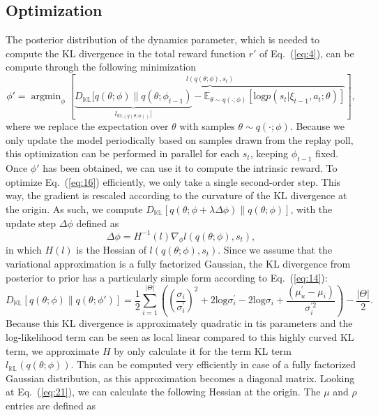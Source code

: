 \documentclass{article}
\begin{document}
	 \subsection{Optimization}
	 The posterior distribution of the dynamics parameter, which is needed to compute the KL divergence in the total reward function $r'$ of Eq.~(\ref{eq:4}), can be compute through the following minimization
	 \begin{equation}
	 \phi' = \mathop{\text{argmin}}_{\phi}\left[\overbrace{\underbrace{D_{\mathds{KL}}[q(\theta;\phi)\|q(\theta;\phi_{t-1})}_{l_{\mathds{KL}(q(\theta;\phi))}]}-\mathds{E}_{\theta\sim q(\cdot;\phi)}[\text{log}p(s_t|\xi_{t-1},a_t;\theta)]}^{l(q(\theta;\phi),s_t)}\right],\label{eq:16}
	 \end{equation}
	 where we replace the expectation over $\theta$ with samples $\theta\sim q(\cdot;\phi)$. Because we only update the model periodically based on samples drawn from the replay poll, this optimization can be performed in parallel for each $s_t$, keeping $\phi_{t-1}$ fixed. Once $\phi'$ has been obtained, we can use it to compute the intrinsic reward.
	 To optimize Eq.~(\ref{eq:16}) efficiently, we only take a single second-order step. This way, the gradient is rescaled according to the curvature of the KL divergence at the origin. As such, we compute $D_{\mathds{KL}}[q(\theta;\phi+\lambda\Delta\phi)\|q(\theta;\phi)]$, with the update step $\Delta\phi$ defined as
	 \begin{equation}
	 \Delta{\phi} = H^{-1}(l)\nabla_\phi l(q(\theta;\phi),s_t),
	 \end{equation}
	 in which $H(l)$ is the Hessian of $l(q(\theta;\phi),s_t)$. Since we assume that the variational approximation is a fully factorized Gaussian, the KL divergence from posterior to prior has a particularly simple form according to Eq.~(\ref{eq:14}):
	 \begin{equation}
	 D_{\mathds{KL}}[q(\theta;\phi)\|q(\theta;\phi')] = \frac{1}{2}\sum_{i=1}^{|\Theta|}\left(\left(\frac{\sigma_i}{\sigma_{i}^{'}}\right)^2+2\text{log}\sigma_i^{'}-2\text{log}\sigma_i+\frac{(\mu_u^{'}-\mu_i)}{\sigma_i^{'2}}\right)-\frac{|\Theta|}{2}.\label{eq:21}
	 \end{equation}
	 Because this KL divergence is approximately quadratic in tis parameters and the log-likelihood term can be seen as local linear compared to this highly curved KL term, we approximate $H$ by only calculate it for the term KL term $l_{\mathds{KL}}(q(\theta;\phi))$. This can be computed very efficiently in case of a fully factorized Gaussian distribution, as this approximation becomes a diagonal matrix. Looking at Eq.~(\ref{eq:21}), we can calculate the following Hessian at the origin. The $\mu$ and $\rho$ entries are defined as
\end{document}

